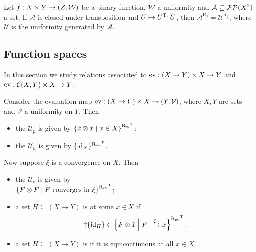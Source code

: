 \begin{lemma}
Let $f: X\times Y\to \left( Z, \mathcal{W} \right)$ be a binary function, $\mathcal{W}$ a uniformity and $\mathcal{A}\subseteq \operatorname{\mathcal{FP}}(X^2)$ a set. If $\mathcal{A}$ is closed under transposition and $U\mapsto U^{\mathrm{T}};U$, then $\mathcal{A}^{\mathrm{R}_{f}} = \mathcal{U}^{\mathrm{R}_{f}}$, where $\mathcal{U}$ is the uniformity generated by $\mathcal{A}$.
\end{lemma}

\subsection{Function spaces}
In this section we study relations associated to $\operatorname{ev}: (X\to Y) \times X \to Y$ and $\operatorname{ev}: \operatorname{\mathcal{C}}(X, Y) \times X \to Y$.

\begin{definition}
Consider the evaluation map $\operatorname{ev}: (X\to Y)\times X \to \left( Y,\mathcal{V} \right)$, where $X, Y$ are sets and $\mathcal{V}$ a uniformity on $Y$. Then
\begin{itemize}
\item the  $\mathcal{U}_p$ is given by $\left\{ \dot{x}\otimes\dot{x} \;\middle|\; x\in X \right\}^{\mathrel{\mathrm{R}_{\operatorname{ev}}}^{\mathrm{T}}}$;
\item the  $\mathcal{U}_u$ is given by $\{\operatorname{id}_X\}^{\mathrel{\mathrm{R}_{\operatorname{ev}}}^{\mathrm{T}}}$.
\end{itemize}
Now suppose $\xi$ is a convergence on $X$. Then
\begin{itemize}
\item the  $\mathcal{U}_c$ is given by \\ $\left\{ F\otimes F \;\middle|\; \text{$F$ converges in $\xi$} \right\}^{\mathrel{\mathrm{R}_{\operatorname{ev}}}^{\mathrm{T}}}$;
\item a set $H\subseteq (X\to Y)$ is  at some $x\in X$ if
\[ \operatorname{\uparrow}\{\operatorname{id}_H\} \in \left\{ F\otimes \dot{x} \;\middle|\; F\overset{\xi}{\longrightarrow}x \right\}^{\mathrel{\mathrm{R}_{\operatorname{ev}}}^{\mathrm{T}}}. \]
\item a set $H\subseteq (X\to Y)$ is  if it is equicontinuous at all $x\in X$.
\end{itemize}
\end{definition}

